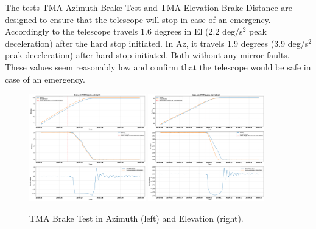 The tests  TMA Azimuth Brake Test and
 TMA Elevation Brake Distance are designed to ensure that the
telescope will stop in case of an emergency. Accordingly to 
the telescope travels 1.6 degrees in El (2.2 deg/s$^2$ peak deceleration) after the hard stop initiated.
In Az, it travels 1.9 degrees (3.9 deg/s$^2$ peak deceleration) after hard stop initiated.
Both without any mirror faults. These values seem reasonably low and confirm that the telescope
would be safe in case of an emergency.

\begin{figure}
  \centering
  \includegraphics[width=0.45\textwidth]{spa/20_vel_acc_jerk/BLOCK-T231_az_brake_tests.png}
  \qquad
  \includegraphics[width=0.45\textwidth]{spa/20_vel_acc_jerk/BLOCK-T240_el_brake_tests.png}
  \caption{TMA Brake Test in Azimuth (left) and Elevation (right).}
  \label{fig:block240_azEl_brake_distance}
\end{figure}


